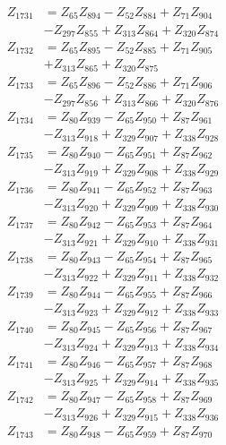 \begin{multicols}{2}
\begin{align}
Z_{1731} &= Z_{65}Z_{894} - Z_{52}Z_{884} + Z_{71}Z_{904}  \nonumber \\
&- Z_{297}Z_{855} + Z_{313}Z_{864} + Z_{320}Z_{874} \nonumber \\
Z_{1732} &= Z_{65}Z_{895} - Z_{52}Z_{885} + Z_{71}Z_{905}  \nonumber \\
&+ Z_{313}Z_{865} + Z_{320}Z_{875} \nonumber \\
Z_{1733} &= Z_{65}Z_{896} - Z_{52}Z_{886} + Z_{71}Z_{906}  \nonumber \\
&- Z_{297}Z_{856} + Z_{313}Z_{866} + Z_{320}Z_{876} \nonumber \\
Z_{1734} &= Z_{80}Z_{939} - Z_{65}Z_{950} + Z_{87}Z_{961}  \nonumber \\
&- Z_{313}Z_{918} + Z_{329}Z_{907} + Z_{338}Z_{928} \nonumber \\
Z_{1735} &= Z_{80}Z_{940} - Z_{65}Z_{951} + Z_{87}Z_{962}  \nonumber \\
&- Z_{313}Z_{919} + Z_{329}Z_{908} + Z_{338}Z_{929} \nonumber \\
Z_{1736} &= Z_{80}Z_{941} - Z_{65}Z_{952} + Z_{87}Z_{963}  \nonumber \\
&- Z_{313}Z_{920} + Z_{329}Z_{909} + Z_{338}Z_{930} \nonumber \\
Z_{1737} &= Z_{80}Z_{942} - Z_{65}Z_{953} + Z_{87}Z_{964}  \nonumber \\
&- Z_{313}Z_{921} + Z_{329}Z_{910} + Z_{338}Z_{931} \nonumber \\
Z_{1738} &= Z_{80}Z_{943} - Z_{65}Z_{954} + Z_{87}Z_{965}  \nonumber \\
&- Z_{313}Z_{922} + Z_{329}Z_{911} + Z_{338}Z_{932} \nonumber \\
Z_{1739} &= Z_{80}Z_{944} - Z_{65}Z_{955} + Z_{87}Z_{966}  \nonumber \\
&- Z_{313}Z_{923} + Z_{329}Z_{912} + Z_{338}Z_{933} \nonumber \\
Z_{1740} &= Z_{80}Z_{945} - Z_{65}Z_{956} + Z_{87}Z_{967}  \nonumber \\
&- Z_{313}Z_{924} + Z_{329}Z_{913} + Z_{338}Z_{934} \nonumber \\
Z_{1741} &= Z_{80}Z_{946} - Z_{65}Z_{957} + Z_{87}Z_{968}  \nonumber \\
&- Z_{313}Z_{925} + Z_{329}Z_{914} + Z_{338}Z_{935} \nonumber \\
Z_{1742} &= Z_{80}Z_{947} - Z_{65}Z_{958} + Z_{87}Z_{969}  \nonumber \\
&- Z_{313}Z_{926} + Z_{329}Z_{915} + Z_{338}Z_{936} \nonumber \\
Z_{1743} &= Z_{80}Z_{948} - Z_{65}Z_{959} + Z_{87}Z_{970}  \nonumber \\

\end{align}
\end{multicols}
